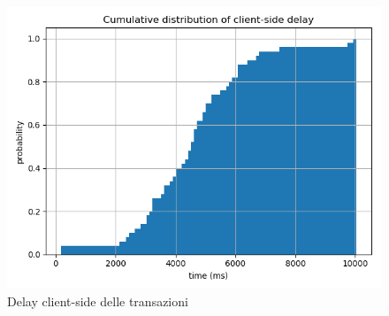 \begin{figure}[h!t]
\centerline{\includegraphics[width=\textwidth]{img/client-side-delay}}
\caption{Delay client-side delle transazioni}
\label{f:calcoli:client}
\end{figure}